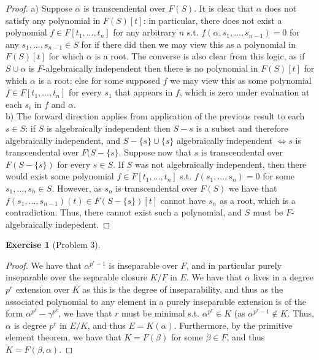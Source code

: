 \documentclass{article}
\newtheorem{exercise}{Exercise}
\begin{document}
\begin{proof}
  a) Suppose $\alpha$ is transcendental over $F(S)$. It is clear that $\alpha$ does not satisfy any polynomial in $F(S)[t]$: in particular, there does not exist a polynomial $f \in F[t_{1},...,t_{n}]$ for any arbitrary $n$ s.t. $f(\alpha,s_{1},...,s_{n-1}) = 0$ for any $s_{1},...,s_{n-1}\in S$ for if there did then we may view this as a polynomial in $F(S)[t]$ for which $\alpha$ is a root. The converse is also clear from this logic, as if $S \cup \alpha$ is $F$-algebraically independent then there is no polynomial in $F(S)[t]$ for which $\alpha$ is a root: else for some supposed $f$ we may view this as some polynomial $\overline f \in F[t_{1},...,t_{n}]$ for every $s_{1}$ that appears in $f$, which is zero under evaluation at each $s_{i}$ in $f$ and $\alpha$. \\
  b) The forward direction applies from application of the previous result to each $s \in S$: if $S$ is algebraically independent then $S-s$ is a subset and therefore algebraically independent, and $S - \{s\} \cup \{s\}$ algebraically independent $\iff s$ is transcendental over $F(S-\{s\}$. Suppose now that $s$ is transcendental over $F(S-\{s\})$ for every $s \in S$. If $S$ was not algebraically independent, then there would exist some polynomial $f \in F[t_{1},...,t_{n}]$ s.t. $f(s_{1},...,s_{n}) = 0$ for some $s_{1},...,s_{n} \in S$. However, as $s_{n}$ is transcendental over $F(S)$ we have that $f(s_{1},...,s_{n-1})(t) \in F(S-\{s\})[t]$ cannot have $s_{n}$ as a root, which is a contradiction. Thus, there cannot exist such a polynomial, and $S$ must be $F$-algebraically indepedent. 
\end{proof}

\begin{exercise}[Problem 3]  
\end{exercise}
\begin{proof}
  We have that $\alpha^{p^{r}-1}$ is inseparable over $F$, and in particular purely inseparable over the separable closure $K/F$ in $E$. We have that $\alpha$ lives in a degree $p^{r}$ extension over $K$ as this is the degree of inseparability, and thus as the associated polynomial to any element in a purely inseparable extension is of the form $\alpha^{p^{k}} - \gamma^{p^{k}}$, we have that $r$ must be minimal s.t. $\alpha^{p^{r}} \in K$ (as $\alpha^{p^{r}-1} \notin K$. Thus,$\alpha$ is degree $p^{r}$ in $E/K$, and thus $E = K(\alpha)$. Furthermore, by the primitive element theorem, we have that $K = F(\beta)$ for some $\beta \in F$, and thus $K = F(\beta, \alpha)$. 
\end{proof}
\end{document}
